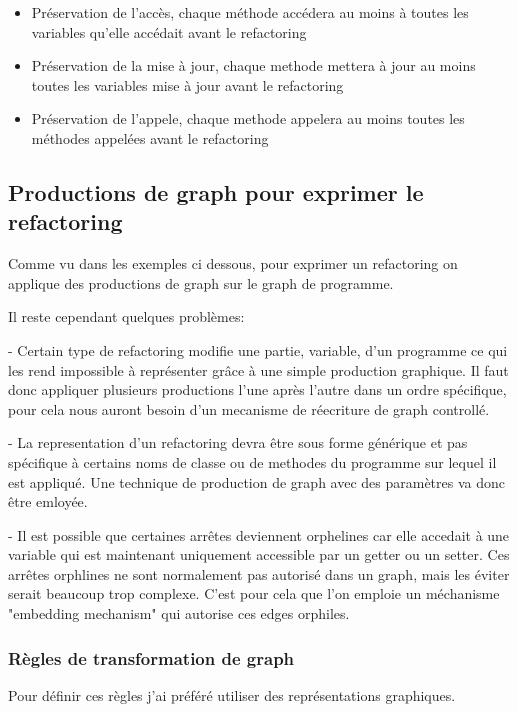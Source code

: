\documentclass[a4paper, 12pt]{article}
\begin{document}
\begin{itemize}
\item Préservation de l'accès, chaque méthode accédera au moins à toutes les variables qu'elle accédait avant le refactoring
\item Préservation de la mise à jour, chaque methode mettera à jour au moins toutes les variables mise à jour avant le refactoring
\item Préservation de l'appele, chaque methode appelera au moins toutes les méthodes appelées avant le refactoring
\end{itemize}

\subsection{Productions de graph pour exprimer le refactoring}

Comme vu dans les exemples ci dessous, pour exprimer un refactoring on applique des productions de graph sur le graph de programme.

Il reste cependant quelques problèmes:

- Certain type de refactoring modifie une partie, variable, d'un programme ce qui les rend impossible à représenter grâce à une simple production graphique. Il faut donc appliquer plusieurs productions l'une après l'autre dans un ordre spécifique, pour cela nous auront besoin d'un mecanisme de réecriture de graph controllé.

- La representation d'un refactoring devra être sous forme générique et pas spécifique à certains noms de classe ou de methodes du programme sur lequel il est appliqué. Une technique de production de graph avec des paramètres va donc être emloyée.

- Il est possible que certaines arrêtes deviennent orphelines car elle accedait à une variable qui est maintenant uniquement accessible par un getter ou un setter. Ces arrêtes orphlines ne sont normalement pas autorisé dans un graph, mais les éviter serait beaucoup trop complexe. C'est pour cela que l'on emploie un méchanisme "embedding mechanism" qui autorise ces edges orphiles.

\subsubsection{Règles de transformation de graph}

Pour définir ces règles j'ai préféré utiliser des représentations graphiques.
\end{document}
